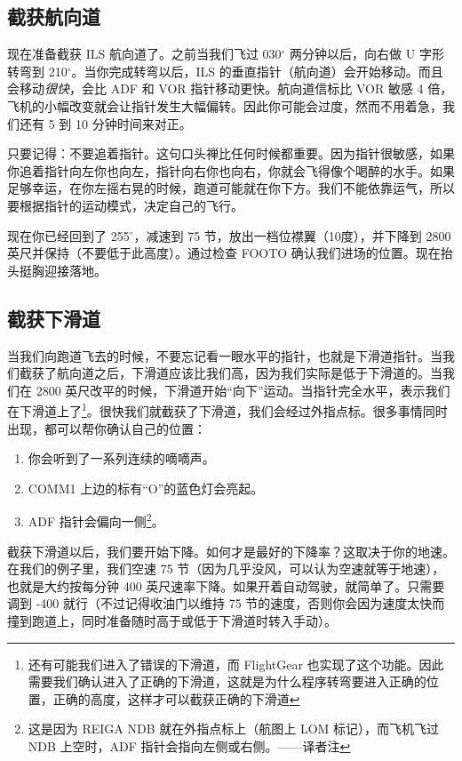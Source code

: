 \subsection{截获航向道}

现在准备截获 ILS 航向道了。之前当我们飞过 030$^\circ$ 两分钟以后，向右做 U 字形转弯到 210$^\circ$。当你完成转弯以后，ILS 的垂直指针（航向道）会开始移动。而且会移动\emph{很快}，会比 ADF 和 VOR 指针移动更快。航向道信标比 VOR 敏感 4 倍，飞机的小幅改变就会让指针发生大幅偏转。因此你可能会过度，然而不用着急，我们还有 5 到 10 分钟时间来对正。

只要记得：不要追着指针。这句口头禅比任何时候都重要。因为指针很敏感，如果你追着指针向左你也向左，指针向右你也向右，你就会飞得像个喝醉的水手。如果足够幸运，在你左摇右晃的时候，跑道可能就在你下方。我们不能依靠运气，所以要根据指针的运动模式，决定自己的飞行。

现在你已经回到了 255$^\circ$，减速到 75 节，放出一档位襟翼（10度），并下降到 2800 英尺并保持（不要低于此高度）。通过检查 FOOTO 确认我们进场的位置。现在抬头挺胸迎接落地。

\subsection{截获下滑道}

当我们向跑道飞去的时候，不要忘记看一眼水平的指针，也就是下滑道指针。当我们截获了航向道之后，下滑道应该比我们高，因为我们实际是低于下滑道的。当我们在 2800 英尺改平的时候，下滑道开始“向下”运动。当指针完全水平，表示我们在下滑道上了\footnote{还有可能我们进入了错误的下滑道，而 FlightGear 也实现了这个功能。因此需要我们确认进入了正确的下滑道，这就是为什么程序转弯要进入正确的位置，正确的高度，这样才可以截获正确的下滑道}。很快我们就截获了下滑道，我们会经过外指点标。很多事情同时出现，都可以帮你确认自己的位置：

\begin{enumerate}
\item 你会听到了一系列连续的嘀嘀声。
\item COMM1 上边的标有“O”的蓝色灯会亮起。
\item ADF 指针会偏向一侧\footnote{这是因为 REIGA NDB 就在外指点标上（航图上 LOM 标记），而飞机飞过 NDB 上空时，ADF 指针会指向左侧或右侧。——译者注}。
\end{enumerate}

截获下滑道以后，我们要开始下降。如何才是最好的下降率？这取决于你的地速。在我们的例子里，我们空速 75 节（因为几乎没风，可以认为空速就等于地速），也就是大约按每分钟 400 英尺速率下降。如果开着自动驾驶，就简单了。只需要调到 -400 就行（不过记得收油门以维持 75 节的速度，否则你会因为速度太快而撞到跑道上，同时准备随时高于或低于下滑道时转入手动）。

